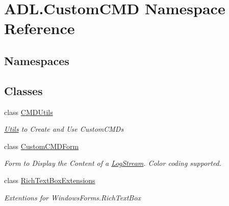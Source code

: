 \hypertarget{namespace_a_d_l_1_1_custom_c_m_d}{}\section{A\+D\+L.\+Custom\+C\+MD Namespace Reference}
\label{namespace_a_d_l_1_1_custom_c_m_d}
\subsection*{Namespaces}
\begin{DoxyCompactItemize}
\end{DoxyCompactItemize}
\subsection*{Classes}
\begin{DoxyCompactItemize}
\item 
class \mbox{\hyperlink{class_a_d_l_1_1_custom_c_m_d_1_1_c_m_d_utils}{C\+M\+D\+Utils}}
\begin{DoxyCompactList}\small\item\em \mbox{\hyperlink{class_a_d_l_1_1_utils}{Utils}} to Create and Use Custom\+C\+M\+Ds \end{DoxyCompactList}\item 
class \mbox{\hyperlink{class_a_d_l_1_1_custom_c_m_d_1_1_custom_c_m_d_form}{Custom\+C\+M\+D\+Form}}
\begin{DoxyCompactList}\small\item\em Form to Display the Content of a \mbox{\hyperlink{class_a_d_l_1_1_log_stream}{Log\+Stream}}. Color coding supported. \end{DoxyCompactList}\item 
class \mbox{\hyperlink{class_a_d_l_1_1_custom_c_m_d_1_1_rich_text_box_extensions}{Rich\+Text\+Box\+Extensions}}
\begin{DoxyCompactList}\small\item\em Extentions for Windows\+Forms.\+Rich\+Text\+Box \end{DoxyCompactList}\end{DoxyCompactItemize}
